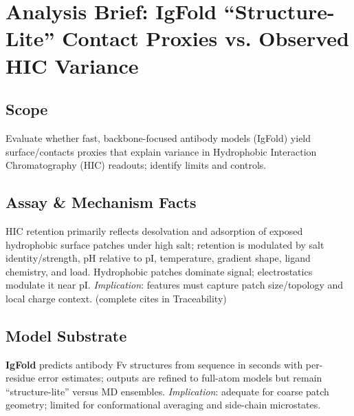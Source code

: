 \section*{Analysis Brief: IgFold “Structure-Lite” Contact Proxies vs. Observed HIC Variance}

\subsection*{Scope}
Evaluate whether fast, backbone-focused antibody models (IgFold) yield surface/contacts proxies that explain variance in Hydrophobic Interaction Chromatography (HIC) readouts; identify limits and controls.

\subsection*{Assay & Mechanism Facts}
HIC retention primarily reflects desolvation and adsorption of exposed hydrophobic surface patches under high salt; retention is modulated by salt identity/strength, pH relative to pI, temperature, gradient shape, ligand chemistry, and load. Hydrophobic patches dominate signal; electrostatics modulate it near pI. \emph{Implication}: features must capture patch size/topology and local charge context. (complete cites in Traceability)

\subsection*{Model Substrate}
\textbf{IgFold} predicts antibody Fv structures from sequence in seconds with per-residue error estimates; outputs are refined to full-atom models but remain “structure-lite” versus MD ensembles. \emph{Implication}: adequate for coarse patch geometry; limited for conformational averaging and side-chain microstates.

